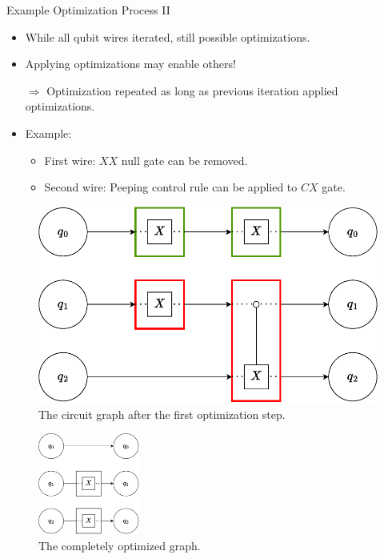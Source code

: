 \begin{frame}{Example Optimization Process II}
    \begin{itemize}
        \item While all qubit wires iterated, still possible optimizations.
        \item Applying optimizations may enable others!
        \item[$\Rightarrow$] Optimization repeated as long as previous iteration applied optimizations.
        \item Example:
        \begin{itemize}
            \item {\color{commentgreen}First wire}: $XX$ null gate can be removed.
            \item {\color{red}Second wire}: Peeping control rule can be applied to $CX$ gate.
        \end{itemize}
    \end{itemize}
    \vfill
    \hfill
    \begin{minipage}{.40\textwidth}
        \begin{figure}[htp]
            \centering     
            \includegraphics[width=\textwidth]{../figures/drawio/slides/circuit_graph_optimized_firststep_colored.pdf}
            \caption{The circuit graph after the first optimization step.}
        \end{figure}
    \end{minipage}
    \hfill
    \begin{minipage}{.30\textwidth}
        \begin{figure}[htp]
            \centering     
            \includegraphics[width=9em]{../figures/drawio/circuit_graph_optimized_complete.pdf}
            \caption{The completely optimized graph.}
        \end{figure}
    \end{minipage}
    \hfill
\end{frame}
